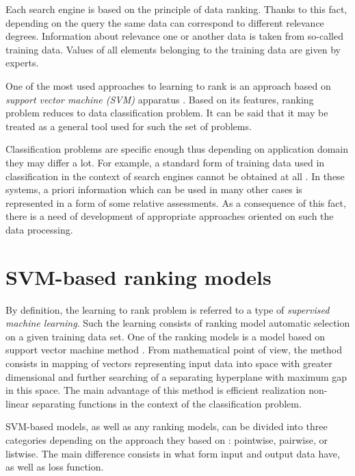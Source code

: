 \documentclass[12pt,a4paper,oneside]{article}
\begin{document}
\par
Each search engine is based on the principle of data ranking. 
Thanks to this fact, depending on the query the same data can correspond to different relevance degrees. 
Information about relevance one or another data is taken from so-called training data. 
Values of all elements belonging to the training data are given by experts.

\par
One of the most used approaches to learning to rank is an approach based on \emph{support vector machine (SVM)} apparatus . 
Based on its features, ranking problem reduces to data classification problem. It can be said that it may be treated as a general tool used for such the set of problems. 

\par
Classification problems are specific enough thus depending on application domain they may differ a lot. 
For example, a standard form of training data used in classification in the context of search engines cannot be obtained at all . 
In these systems, a priori information which can be used in many other cases is represented in a form of some relative assessments. 
As a consequence of this fact, there is a need of development of appropriate approaches oriented on such the data processing.


\section{SVM-based ranking models}
\label{sec:svm_based_ranking_models}

\par
By definition, the learning to rank problem is referred to a type of \emph{supervised machine learning}. 
Such the learning consists of ranking model automatic selection on a given training data set. One of the ranking models is a model based on support vector machine method .  
From mathematical point of view, the method consists in mapping of vectors representing input data into space with greater dimensional and further searching of a separating hyperplane with maximum gap in this space. 
The main advantage of this method is efficient realization non-linear separating functions in the context of the classification problem.

\par
SVM-based models, as well as any ranking models, can be divided into three categories depending on the approach they based on : pointwise, pairwise, or listwise. 
The main difference consists in what form input and output data have, as well as loss function.
\end{document}
